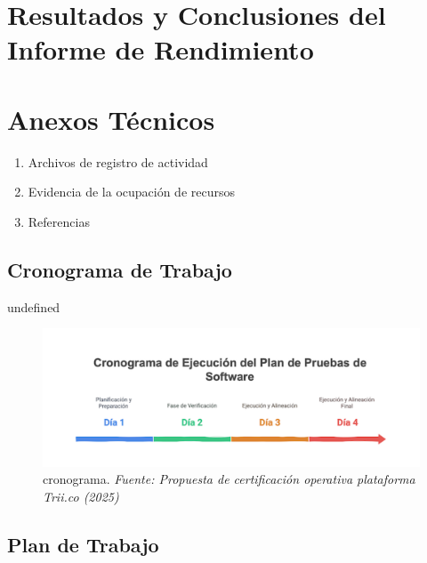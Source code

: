 \documentclass[
  paper=a4,
  ,captions=tableheading
]{scrartcl}
\providecommand{\tightlist}{%
  \setlength{\itemsep}{0pt}\setlength{\parskip}{0pt}}
\renewenvironment{quote}{\begin{customblockquote}\list{}{\rightmargin=0em\leftmargin=0em}%
\item\relax\color{blockquote-text}\ignorespaces}{\unskip\unskip\endlist\end{customblockquote}}
\begin{document}
\newpage

\section{Resultados y Conclusiones del Informe de
Rendimiento}\label{sec:resultados-y-conclusiones-del-informe-de-rendimiento}

\newpage

\section{Anexos Técnicos}\label{sec:anexos-tuxe9cnicos}

\begin{enumerate}
\def\labelenumi{\arabic{enumi}.}
\tightlist
\item
  Archivos de registro de actividad
\item
  Evidencia de la ocupación de recursos
\item
  Referencias
\end{enumerate}

\subsection{Cronograma de Trabajo}\label{sec:cronograma-de-trabajo}

\begin{quote}
undefined
\end{quote}

\begin{figure}
\centering
\includegraphics{images/cronograma.png}
\caption{cronograma. \emph{Fuente: Propuesta de certificación operativa
plataforma Trii.co
(2025)}}\label{fig:id-c25995aaf9a249059f91f586acdbec41}
\end{figure}

\subsection{Plan de Trabajo}\label{sec:plan-de-trabajo-1}
\end{document}
